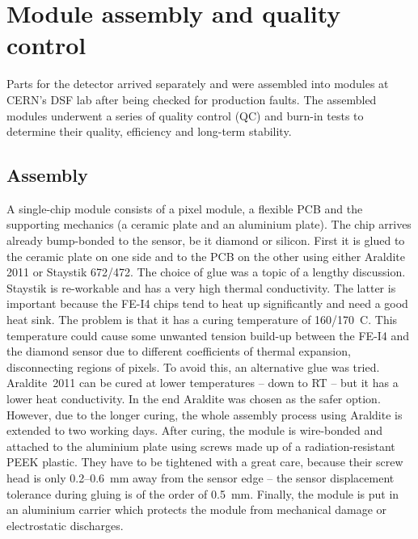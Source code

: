 \documentclass[12pt]{packages/mytustyle}  %
\begin{document}
\section{Module assembly and quality control}
Parts for the detector arrived separately and were assembled into modules at CERN's DSF lab after being checked for production faults. The assembled modules underwent a series of quality control (QC) and burn-in tests to determine their quality, efficiency and long-term stability.
\subsection{Assembly}
A single-chip module consists of a pixel module, a flexible PCB and the supporting mechanics (a ceramic plate and an aluminium plate). The chip arrives already bump-bonded to the sensor, be it diamond or silicon. First it is glued to the ceramic plate on one side and to the PCB on the other using either Araldite 2011 or Staystik 672/472. The choice of glue was a topic of a lengthy discussion. Staystik is re-workable and has a very high thermal conductivity. The latter is important because the FE-I4 chips tend to heat up significantly and need a good heat sink. The problem is that it has a curing temperature of 160/170~\textdegree C. This temperature could cause some unwanted tension build-up between the FE-I4 and the diamond sensor due to different coefficients of thermal expansion, disconnecting regions of pixels. To avoid this, an alternative glue was tried. Araldite~2011 can be cured at lower temperatures -- down to RT -- but it has a lower heat conductivity. In the end Araldite was chosen as the safer option. However, due to the longer curing, the whole assembly process using Araldite is extended to two working days. After curing, the module is wire-bonded and attached to the aluminium plate using screws made up of a radiation-resistant PEEK plastic. They have to be tightened with a great care, because their screw head is only 0.2--0.6~mm away from the sensor edge -- the sensor displacement tolerance during gluing is of the order of 0.5~mm. Finally, the module is put in an aluminium carrier which protects the module from mechanical damage or electrostatic discharges.
\end{document}
